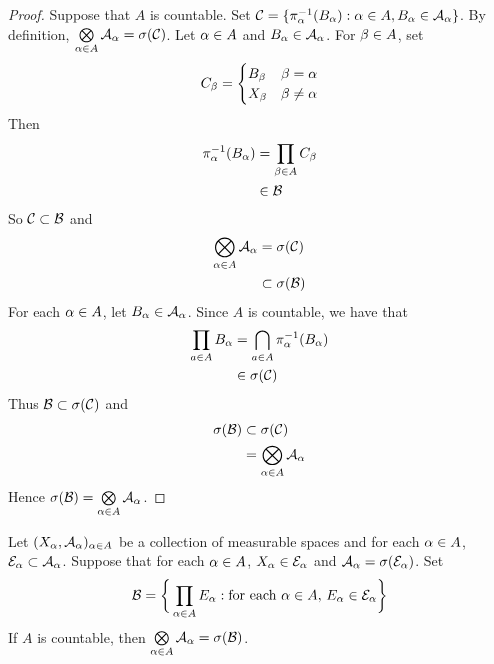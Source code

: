 \documentclass{book}
\begin{document}
 	\begin{proof}
 		Suppose that $A$ is countable. Set $\mathcal{C} = \{\pi_{\alpha}^{-1}(B_{\alpha}): \alpha \in A, B_{\alpha} \in \mathcal{A}_{\alpha}\}$. By definition, $\bigotimes\limits_{\alpha \in A} \mathcal{A}_{\alpha} = \sigma(\mathcal{C})$. Let $\alpha \in A$ and $B_{\alpha} \in \mathcal{A}_{\alpha}$. For $\beta \in A$, set 
 		\[
 		C_{\beta} = 
 		\begin{cases}
 			B_{\beta} & \beta = \alpha \\
 			X_{\beta} & \beta \neq \alpha
 		\end{cases}
 		\]
 		Then 
 		\begin{align*}
 			\pi_{\alpha}^{-1}(B_{\alpha}) 
 			& = \prod_{\beta \in A} C_{\beta} \\
 			& \in \mathcal{B}
 		\end{align*}
 		So $\mathcal{C} \subset \mathcal{B}$ and 
 		\begin{align*}
 			\bigotimes\limits_{\alpha \in A} \mathcal{A}_{\alpha}
 			& = \sigma(\mathcal{C}) \\
 			& \subset \sigma(\mathcal{B})
 		\end{align*}
 		For each $\alpha \in A$, let $B_{\alpha} \in \mathcal{A}_{\alpha}$. Since $A$ is countable, we have that 
 		\begin{align*}
 			\prod_{a \in A} B_{\alpha} 
 			& = \bigcap_{a \in A} \pi_{\alpha}^{-1}(B_{\alpha}) \\
 			& \in \sigma(\mathcal{C}) 
 		\end{align*}
 		Thus $\mathcal{B} \subset \sigma(\mathcal{C})$ and 
 		\begin{align*}
 			\sigma(\mathcal{B}) 
 			& \subset \sigma(\mathcal{C}) \\
 			& = \bigotimes\limits_{\alpha \in A} \mathcal{A}_{\alpha}
 		\end{align*}
 		Hence $\sigma(\mathcal{B}) = \bigotimes\limits_{\alpha \in A} \mathcal{A}_{\alpha}$. 
 	\end{proof}
 
 	\begin{ex} 
 		Let $(X_{\alpha}, \mathcal{A}_{\alpha})_{\alpha \in A}$ be a collection of measurable spaces and for each $\alpha \in A$, $\mathcal{E}_{\alpha} \subset \mathcal{A}_{\alpha}$. Suppose that for each $\alpha \in A$, $X_{\alpha} \in \mathcal{E}_{\alpha}$ and $\mathcal{A}_{\alpha} = \sigma(\mathcal{E}_{\alpha})$. Set 
 		$$\mathcal{B} = \bigg \{ \prod\limits_{\alpha \in A} E_{\alpha}:  \text{for each $\alpha \in A$, } E_{\alpha} \in \mathcal{E}_{\alpha} \bigg \}$$ 
 		If $A$ is countable, then $\bigotimes\limits_{\alpha \in A} \mathcal{A}_{\alpha} = \sigma(\mathcal{B})$.
 	\end{ex}
 
\end{document}
